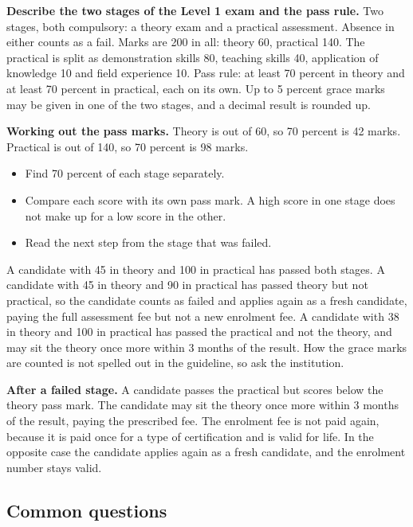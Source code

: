 \textbf{Describe the two stages of the Level 1 exam and the pass rule.} Two stages, both compulsory: a theory exam and a practical assessment. Absence in either counts as a fail. Marks are 200 in all: theory 60, practical 140. The practical is split as demonstration skills 80, teaching skills 40, application of knowledge 10 and field experience 10. Pass rule: at least 70 percent in theory and at least 70 percent in practical, each on its own. Up to 5 percent grace marks may be given in one of the two stages, and a decimal result is rounded up.

\textbf{Working out the pass marks.} Theory is out of 60, so 70 percent is 42 marks. Practical is out of 140, so 70 percent is 98 marks.
\begin{itemize}
\item Find 70 percent of each stage separately.
\item Compare each score with its own pass mark. A high score in one stage does not make up for a low score in the other.
\item Read the next step from the stage that was failed.
\end{itemize}
A candidate with 45 in theory and 100 in practical has passed both stages. A candidate with 45 in theory and 90 in practical has passed theory but not practical, so the candidate counts as failed and applies again as a fresh candidate, paying the full assessment fee but not a new enrolment fee. A candidate with 38 in theory and 100 in practical has passed the practical and not the theory, and may sit the theory once more within 3 months of the result. How the grace marks are counted is not spelled out in the guideline, so ask the institution.

\textbf{After a failed stage.} A candidate passes the practical but scores below the theory pass mark. The candidate may sit the theory once more within 3 months of the result, paying the prescribed fee. The enrolment fee is not paid again, because it is paid once for a type of certification and is valid for life. In the opposite case the candidate applies again as a fresh candidate, and the enrolment number stays valid.

\subsection*{Common questions}

